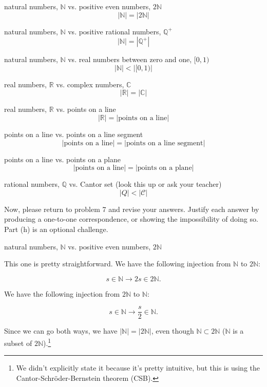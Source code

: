 \documentclass[../gatm_answers.tex]{subfiles}
\begin{document}
\begin{inner_problem}[start=1]
\item natural numbers, $\mathbb{N}$ vs. positive even numbers, $2\mathbb{N}$
$$|\mathbb{N}|=|2\mathbb{N}|$$
\item natural numbers, $\mathbb{N}$ vs. positive rational numbers, $\mathbb{Q}^+$
$$|\mathbb{N}|=\left|\mathbb{Q}^+\right|$$
\item natural numbers, $\mathbb{N}$ vs. real numbers between zero and one, $[0,1)$
$$|\mathbb{N}|<|[0,1)|$$
\item real numbers, $\mathbb{R}$ vs. complex numbers, $\mathbb{C}$
$$|\mathbb{R}|=|\mathbb{C}|$$
\item real numbers, $\mathbb{R}$ vs. points on a line
$$|\mathbb{R}|=|\text{points on a line}|$$
\item points on a line vs. points on a line segment
$$|\text{points on a line}|=|\text{points on a line segment}|$$
\item points on a line vs. points on a plane
$$|\text{points on a line}|=|\text{points on a plane}|$$
\item rational numbers, $\mathbb{Q}$ vs. Cantor set (look this up or ask your teacher)
$$|Q|<|\mathcal{C}|$$
\end{inner_problem}

\begin{outer_problem}
\item Now, please return to problem 7 and revise your answers. Justify each answer by producing a one-to-one correspondence, or showing the impossibility of doing so. Part (h) is an optional challenge.
\end{outer_problem}

\begin{inner_problem}[start=1]
\item natural numbers, $\mathbb{N}$ vs. positive even numbers, $2\mathbb{N}$
\end{inner_problem}

This one is pretty straightforward. We have the following injection from $\mathbb{N}$ to $2\mathbb{N}$:

$$s\in \mathbb{N} \to 2s\in 2\mathbb{N}.$$

We have the following injection from $2\mathbb{N}$ to $\mathbb{N}$:

$$s\in \mathbb{N} \to \frac{s}{2}\in \mathbb{N}.$$

Since we can go both ways, we have $|\mathbb{N}| = |2\mathbb{N}|$, even though $\mathbb{N}\subset 2\mathbb{N}$ ($\mathbb{N}$ is a subset of $2\mathbb{N}$).\footnote{We didn't explicitly state it because it's pretty intuitive, but this is using the Cantor-Schröder-Bernstein theorem (CSB).}
\end{document}
